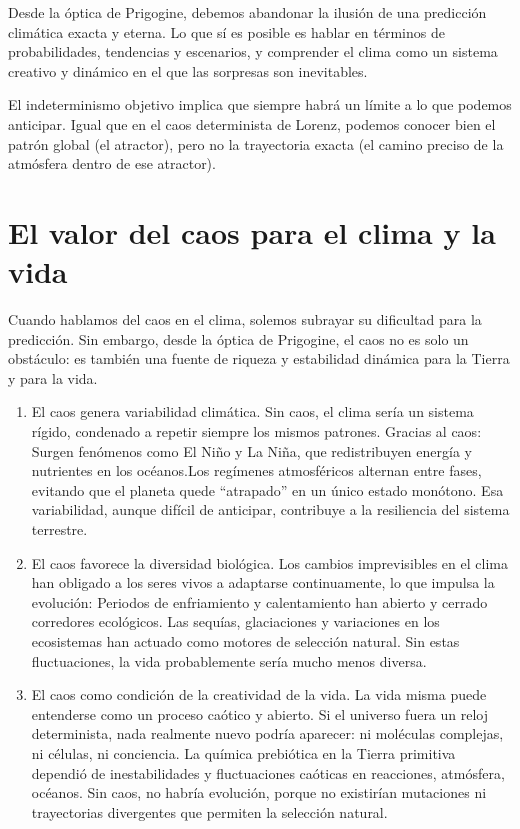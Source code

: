 \documentclass[
  11pt,
  a4paper,
  DIV=11,
  numbers=noendperiod]{scrreprt}
\begin{document}
Desde la óptica de Prigogine, debemos abandonar la ilusión de una
predicción climática exacta y eterna. Lo que sí es posible es hablar en
términos de probabilidades, tendencias y escenarios, y comprender el
clima como un sistema creativo y dinámico en el que las sorpresas son
inevitables.

El indeterminismo objetivo implica que siempre habrá un límite a lo que
podemos anticipar. Igual que en el caos determinista de Lorenz, podemos
conocer bien el patrón global (el atractor), pero no la trayectoria
exacta (el camino preciso de la atmósfera dentro de ese atractor).

\section{El valor del caos para el clima y la
vida}\label{el-valor-del-caos-para-el-clima-y-la-vida}

Cuando hablamos del caos en el clima, solemos subrayar su dificultad
para la predicción. Sin embargo, desde la óptica de Prigogine, el caos
no es solo un obstáculo: es también una fuente de riqueza y estabilidad
dinámica para la Tierra y para la vida.

\begin{enumerate}
\def\labelenumi{\arabic{enumi}.}
\item
  El caos genera variabilidad climática. Sin caos, el clima sería un
  sistema rígido, condenado a repetir siempre los mismos patrones.
  Gracias al caos: Surgen fenómenos como El Niño y La Niña, que
  redistribuyen energía y nutrientes en los océanos.Los regímenes
  atmosféricos alternan entre fases, evitando que el planeta quede
  ``atrapado'' en un único estado monótono. Esa variabilidad, aunque
  difícil de anticipar, contribuye a la resiliencia del sistema
  terrestre.
\item
  El caos favorece la diversidad biológica. Los cambios imprevisibles en
  el clima han obligado a los seres vivos a adaptarse continuamente, lo
  que impulsa la evolución: Periodos de enfriamiento y calentamiento han
  abierto y cerrado corredores ecológicos. Las sequías, glaciaciones y
  variaciones en los ecosistemas han actuado como motores de selección
  natural. Sin estas fluctuaciones, la vida probablemente sería mucho
  menos diversa.
\item
  El caos como condición de la creatividad de la vida. La vida misma
  puede entenderse como un proceso caótico y abierto. Si el universo
  fuera un reloj determinista, nada realmente nuevo podría aparecer: ni
  moléculas complejas, ni células, ni conciencia. La química prebiótica
  en la Tierra primitiva dependió de inestabilidades y fluctuaciones
  caóticas en reacciones, atmósfera, océanos. Sin caos, no habría
  evolución, porque no existirían mutaciones ni trayectorias divergentes
  que permiten la selección natural.
\end{enumerate}
\end{document}
